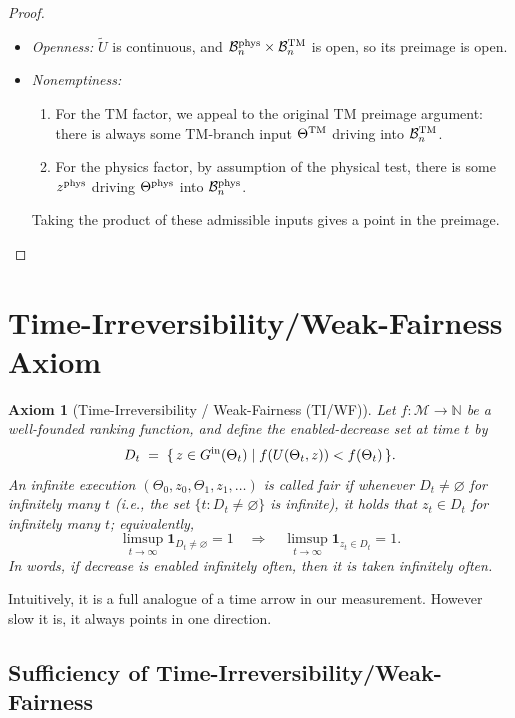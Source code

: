 \documentclass[12pt]{article}
\theoremstyle{definition}
\theoremstyle{plain}
\newtheorem{axiom}{Axiom}[section]
\begin{document}
\begin{proof}
\begin{itemize}
  \item \emph{Openness:} \(\widetilde U\) is continuous, and
    \(\mathcal B_n^{\rm phys}\times\mathcal B_n^{\rm TM}\) is open, so
    its preimage is open.
  \item \emph{Nonemptiness:}  
    \begin{enumerate}
      \item For the TM factor, we appeal to the original TM preimage
            argument: there is always some TM‐branch input
            \(\Theta^{\rm TM}\) driving into \(\mathcal B_n^{\rm TM}\).
      \item For the physics factor, by assumption of the physical test,
            there is some \(z^{\rm phys}\) driving
            \(\Theta^{\rm phys}\) into \(\mathcal B_n^{\rm phys}\).
    \end{enumerate}
    Taking the product of these admissible inputs gives a point in the
    preimage.  
\end{itemize}
\end{proof}

\section{Time-Irreversibility/Weak-Fairness Axiom}
\begin{axiom}[Time-Irreversibility / Weak-Fairness (TI/WF)]
\label{ax:ti-wf-subsec}
Let \(f:\mathcal M\to\mathbb N\) be a well-founded ranking function, and define the enabled-decrease set at time \(t\) by
\[
  D_t \;=\; \{\,z\in G^{\rm in}(\Theta_t)\mid f(U(\Theta_t,z))<f(\Theta_t)\,\}.
\]
An infinite execution \((\Theta_0,z_0,\Theta_1,z_1,\dots)\) is called \emph{fair} if whenever \(D_t\neq\varnothing\) for infinitely many \(t\) (i.e., the set \(\{t: D_t\neq\varnothing\}\) is infinite), it holds that \(z_t\in D_t\) for infinitely many \(t\); equivalently,
\[
\limsup_{t\to\infty} \mathbf{1}_{D_t\neq\varnothing} = 1
\quad\Longrightarrow\quad
\limsup_{t\to\infty} \mathbf{1}_{z_t\in D_t} = 1.
\]
In words, if decrease is enabled infinitely often, then it is taken infinitely often.
\end{axiom}


Intuitively, it is a full analogue of a time arrow in our measurement. However slow it is, it always points in one direction.

\subsection{Sufficiency of Time-Irreversibility/Weak-Fairness}
\label{sec:sufficiency-ti-wf}
\end{document}
